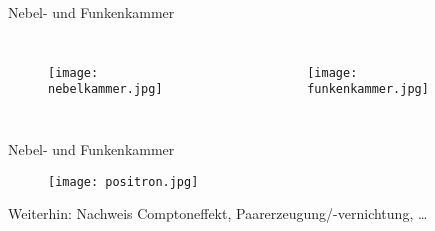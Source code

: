 
\begin{frame}{Nebel- und Funkenkammer}
    \begin{columns}[T]
			\begin{figure}[htbp]
			  \centering
			  \texttt{[image: nebelkammer.jpg]}
			\end{figure}
			
	    	\begin{figure}[htbp]
			  \centering
			  \texttt{[image: funkenkammer.jpg]}
			\end{figure}
    \end{columns}
\end{frame}

\begin{frame}{Nebel- und Funkenkammer}
			\begin{figure}[htbp]
			  \centering
			  \texttt{[image: positron.jpg]}
			\end{figure}
		Weiterhin: Nachweis Comptoneffekt, Paarerzeugung/-vernichtung, \ldots
\end{frame}

